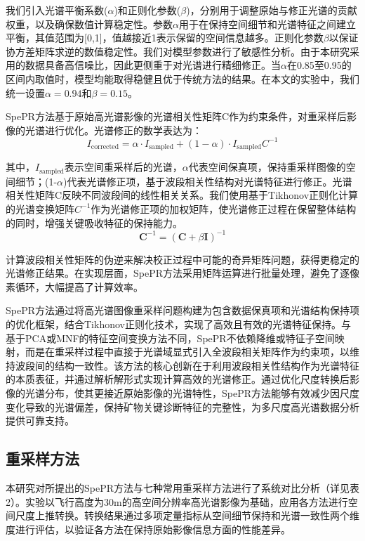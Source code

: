 我们引入光谱平衡系数($\alpha$)和正则化参数($\beta$)，分别用于调整原始与修正光谱的贡献权重，以及确保数值计算稳定性。参数$\alpha$用于在保持空间细节和光谱特征之间建立平衡，其值范围为[0,1]，值越接近1表示保留的空间信息越多。正则化参数$\beta$以保证协方差矩阵求逆的数值稳定性。我们对模型参数进行了敏感性分析。由于本研究采用的数据具备高信噪比，因此更侧重于对光谱进行精细修正。当$\alpha$在0.85至0.95的区间内取值时，模型均能取得稳健且优于传统方法的结果。在本文的实验中，我们统一设置$\alpha=0.94$和$\beta=0.15$。

SpePR方法基于原始高光谱影像的光谱相关性矩阵C作为约束条件，对重采样后影像的光谱进行优化。光谱修正的数学表达为：
\begin{equation}
I_{\text{corrected}} = \alpha \cdot I_{\text{sampled}} + (1-\alpha) \cdot I_{\text{sampled}} C^{-1}
\label{eq:I_corrected}
\end{equation}

其中，$I_{\text{sampled}}$表示空间重采样后的光谱，$\alpha$代表空间保真项，保持重采样图像的空间细节；(1-$\alpha$)代表光谱修正项，基于波段相关性结构对光谱特征进行修正。光谱相关性矩阵C反映不同波段间的线性相关关系。我们使用基于Tikhonov\cite{tikhonov1963solution}正则化计算的光谱变换矩阵$C^{-1}$作为光谱修正项的加权矩阵，使光谱修正过程在保留整体结构的同时，增强关键吸收特征的保持能力。
\begin{equation}
\mathbf{C}^{-1} = \left( \mathbf{C} + \beta \mathbf{I} \right)^{-1}
\label{eq:C_inverse_correction}
\end{equation}

计算波段相关性矩阵的伪逆来解决校正过程中可能的奇异矩阵问题，获得更稳定的光谱修正结果。在实现层面，SpePR方法采用矩阵运算进行批量处理，避免了逐像素循环，大幅提高了计算效率。

SpePR方法通过将高光谱图像重采样问题构建为包含数据保真项和光谱结构保持项的优化框架，结合Tikhonov正则化技术，实现了高效且有效的光谱特征保持。与基于PCA或MNF的特征空间变换方法不同\cite{kang2020hyperspectral,cao2018robust}，SpePR不依赖降维或特征子空间映射，而是在重采样过程中直接于光谱域显式引入全波段相关矩阵作为约束项，以维持波段间的结构一致性。该方法的核心创新在于利用波段相关性结构作为光谱特征的本质表征，并通过解析解形式实现计算高效的光谱修正。通过优化尺度转换后影像的光谱分布，使其更接近原始影像的光谱特性，SpePR方法能够有效减少因尺度变化导致的光谱偏差，保持矿物关键诊断特征的完整性，为多尺度高光谱数据分析提供可靠支持。

\subsection{重采样方法}
本研究对所提出的SpePR方法与七种常用重采样方法进行了系统对比分析（详见表2）。实验以飞行高度为30m的高空间分辨率高光谱影像为基础，应用各方法进行空间尺度上推转换。转换结果通过多项定量指标从空间细节保持和光谱一致性两个维度进行评估，以验证各方法在保持原始影像信息方面的性能差异。

